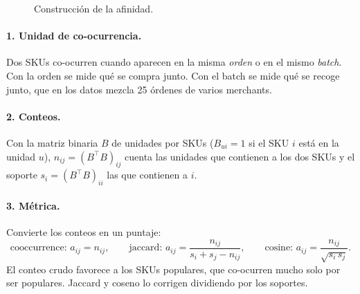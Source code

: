 \documentclass[11pt,a4paper,oneside]{report}
\begin{document}
\begin{figure}[ht]
\centering
{}
\caption{Construcción de la afinidad.}
\label{fig:afinidad}
\end{figure}

\paragraph{1. Unidad de co-ocurrencia.} Dos SKUs co-ocurren cuando aparecen en la misma
\emph{orden} o en el mismo \emph{batch}. Con la orden se mide qué se compra junto. Con el
batch se mide qué se recoge junto, que en los datos mezcla 25 órdenes de varios merchants.

\paragraph{2. Conteos.} Con la matriz binaria $B$ de unidades por SKUs ($B_{ui} = 1$ si el SKU
$i$ está en la unidad $u$), $n_{ij} = (B^\top B)_{ij}$ cuenta las unidades que contienen a los
dos SKUs y el soporte $s_i = (B^\top B)_{ii}$ las que contienen a $i$.

\paragraph{3. Métrica.} Convierte los conteos en un puntaje:
\[
\text{cooccurrence: } a_{ij} = n_{ij}, \qquad
\text{jaccard: } a_{ij} = \frac{n_{ij}}{s_i + s_j - n_{ij}}, \qquad
\text{cosine: } a_{ij} = \frac{n_{ij}}{\sqrt{s_i\, s_j}}.
\]
El conteo crudo favorece a los SKUs populares, que co-ocurren mucho solo por ser populares.
Jaccard y coseno lo corrigen dividiendo por los soportes.
\end{document}
